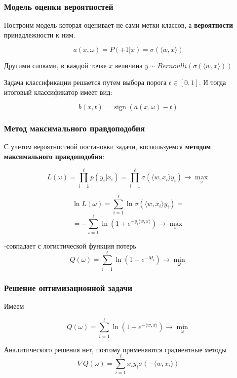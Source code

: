 \documentclass{beamer}
\DeclareMathOperator{\sign}{sign}
\begin{document}
	\begin{frame}
		\frametitle{Модель оценки вероятностей}
		Построим модель которая оценивает не сами метки классов, а \textbf{вероятности} принадлежности к ним.
		
		\[
		a(x, \omega) = P(+1 | x) = \sigma(\langle w, x \rangle)
		\]
		
		Другими словами, в каждой точке $x$ величина $y \sim Bernoulli(\sigma(\langle w, x \rangle))$
		
		\vspace{15pt}
		
		Задача классификации решается путем выбора порога $t \in [0, 1]$. И тогда итоговый классификатор имеет вид:
		
		\[
			b(x, t) = \sign (a(x, \omega) - t)
		\]
		
	\end{frame}
	
	\begin{frame}
		\frametitle{Метод максимального правдоподобия}
		С учетом вероятностной постановки задачи, воспользуемся \textbf{методом максимального правдоподобия}:
		
		\[
		L(\omega) = \prod_{i=1}^{\ell} p(y_i | x_i) = 
		\prod_{i=1}^{\ell} \sigma(\langle w, x_i \rangle y_i)
		\rightarrow \max_{\omega}
		\]
		
		\[
			\ln L(\omega) 
			= \sum_{i=1}^{\ell} \ln \sigma(\langle w, x_i \rangle y_i)
			=
		\]
		\[
		= 
		- \sum_{i=1}^{\ell} \ln(1 + e^{-y_i \langle w, x \rangle}) \rightarrow \max_{\omega}
		\]
		
		-совпадает с логистической функция потерь 
		\[
		Q(\omega) = \sum_{i=1}^{\ell} \ln (1 + e^{-M_i}) \rightarrow \min_{\omega}
		\]
	\end{frame}
	
	\begin{frame}
		\frametitle{Решение оптимизационной задачи}
		Имеем
		
		\[
		Q(\omega) = \sum_{i=1}^{\ell} \ln (1 + e^{-\langle w, x \rangle}) \rightarrow \min_{\omega}
		\]
		
		Аналитического решения нет, поэтому применяются градиентные методы
		\[
		\nabla Q(\omega) = \sum_{i=1}^{\ell} x_i y_i \sigma(- \langle w, x_i \rangle)
		\]
	\end{frame}
	
\end{document}
